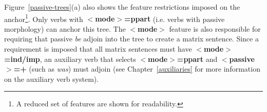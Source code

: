 Figure~\ref{passive-trees}(a) also shows the feature restrictions imposed on 
the anchor\footnote{A reduced set of features are shown for readability.}. Only 
verbs with {\bf $<$mode$>$=ppart} (i.e. verbs with passive morphology) can 
anchor this tree.  The {\bf $<$mode$>$} feature is also responsible for 
requiring that passive {\it be} adjoin into the tree to create a matrix 
sentence.  Since a requirement is imposed that all matrix sentences must have 
{\bf $<$mode$>$=ind/imp}, an auxiliary verb that selects {\bf $<$mode$>$=ppart} and {\bf $<$passive$>$=+} (such as {\it was}) must adjoin 
(see Chapter~\ref{auxiliaries} for more information on the auxiliary verb 
system). 
 
 
 
 
 
 
 
 
 
